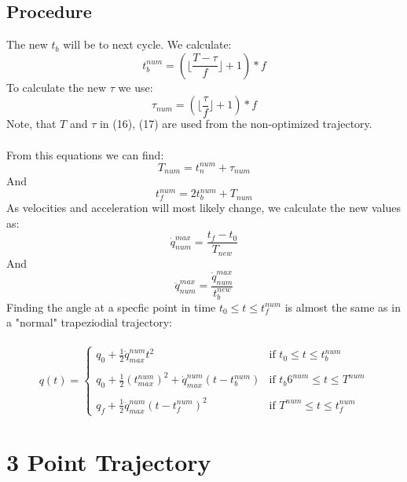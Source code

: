 \documentclass{article}
\begin{document}
	\subsection{Procedure}
	The new $t_b$ will be to next cycle. We calculate:
	\begin{equation}
	t_{b}^{num} = (\lfloor \frac{T-\tau}{f}\rfloor + 1) * f
	\end{equation}
	To calculate the new $\tau$ we use:
	\begin{equation}
	\tau_{num} = (\lfloor \frac{\tau}{f}\rfloor +1)*f
	\end{equation}
	Note, that $T$ and $\tau$ in (16), (17) are used from the non-optimized trajectory.\\\\
	From this equations we can find:
	\begin{equation}
	T_{num} = t_{n}^{num} + \tau_{num}
	\end{equation}
	And
	\begin{equation}
	t_{f}^{num} = 2t_{b}^{num} + T_{num}
	\end{equation}
	As velocities and acceleration will most likely change, we calculate the new values as:
	\begin{equation}
	\dot{q}_{num}^{max} = \frac{t_f-t_0}{T_{new}}
	\end{equation}
	And
	\begin{equation}
	\ddot{q}_{num}^{max} = \frac{\dot{q}_{num}^{max}}{t_{b}^{new}}
	\end{equation}
	Finding the angle at a specfic point in time $t_{0}\leq t \leq t_{f}^{num}$ is almost the same as in a "normal" trapeziodial trajectory:\\\\
	\begin{equation}
	q(t) =
\left\{
	\begin{array}{ll}
		q_{0}+\frac{1}{2}\ddot{q}_{max}^{num}t^{2}  & \mbox{if } t_{0}\leq t \leq t_{b}^{num} \\\\
		q_{0}+\frac{1}{2}(t_{max}^{num})^{2}+ \dot{q}_{max}^{num}(t-t_{b}^{num}) & \mbox{if } t_{b}6^{num}\leq t \leq T^{num} \\\\
		q_{f}+\frac{1}{2}\ddot{q}_{max}^{num}(t-t_{f}^{num})^{2} & \mbox{if }T^{num}\leq t \leq t_{f}^{num}
	\end{array}
\right.
	\end{equation}
	\newpage
	\section{3 Point Trajectory}
\end{document}
